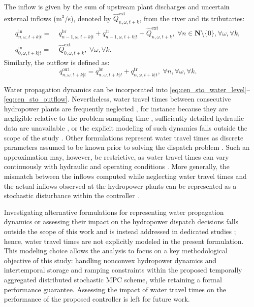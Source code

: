 \documentclass[a4paper,fleqn]{cas-sc}
\begin{document}
The inflow is given by the sum of upstream plant discharges and uncertain external inflows (m$^3$/s), denoted by $\hat{Q}^{\mathrm{ext}}_{n,\omega,t+k}$, from the river and its tributaries:
\begin{align}
    q^{\mathrm{in}}_{n, \omega, t+k | t} = & \; q^{\mathrm{br}}_{n-1, \omega, t+k | t} + q^{\mathrm{tr}}_{n-1, \omega, t+k | t} + \hat{Q}^\mathrm{ext}_{n, \omega, t+k}, \; \forall n \in \boldsymbol{N} \setminus \{0\}, \forall \omega, \forall k, \label{eq:cen_sto_inflow}\\
    q^{\mathrm{in}}_{0, \omega, t+k | t} = & \; \hat{Q}^\mathrm{ext}_{0, \omega, t+k}, \; \forall \omega, \forall k. \label{eq:cen_sto_inflow_init}
\end{align}
Similarly, the outflow is defined as:
\begin{equation}
\label{eq:cen_sto_outflow}
    q^{\mathrm{out}}_{n, \omega, t+k | t} = q^{\mathrm{br}}_{n, \omega, t+k | t} + q^{\mathrm{tr}}_{n, \omega, t+k | t}, \; \forall n, \forall \omega, \forall k.
\end{equation}

Water propagation dynamics can be incorporated into \eqref{eq:cen_sto_water_level}--\eqref{eq:cen_sto_outflow}.
Nevertheless, water travel times between consecutive hydropower plants are frequently neglected \cite{kumar2011genetic},
for instance because they are negligible relative to the problem sampling time \cite{xu2018analysis},
sufficiently detailed hydraulic data are unavailable \cite{li2026scheduling},
or the explicit modeling of such dynamics falls outside the scope of the study \cite{khodadadi2022stochastic}.
Other formulations represent water travel times as discrete parameters assumed to be known prior to solving the dispatch problem \cite{zheng2026leveraging,xie2021hydropower}.
Such an approximation may, however, be restrictive, as water travel times can vary continuously with hydraulic and operating conditions \cite{ge2018successive}.
More generally, the mismatch between the inflows computed while neglecting water travel times and the actual inflows observed at the hydropower plants can be represented as a stochastic disturbance within the controller \cite{zanoli2024model}.

Investigating alternative formulations for representing water propagation dynamics or assessing their impact on the hydropower dispatch decisions falls outside the scope of this work and is instead addressed in dedicated studies \cite{ge2018successive,yuan2022optimal};
hence, water travel times are not explicitly modeled in the present formulation.
This modeling choice allows the analysis to focus on a key methodological objective of this study:
handling nonconvex hydropower dynamics and intertemporal storage and ramping constraints within the proposed temporally aggregated distributed stochastic MPC scheme, while retaining a formal performance guarantee.
Assessing the impact of water travel times on the performance of the proposed controller is left for future work.
\end{document}

